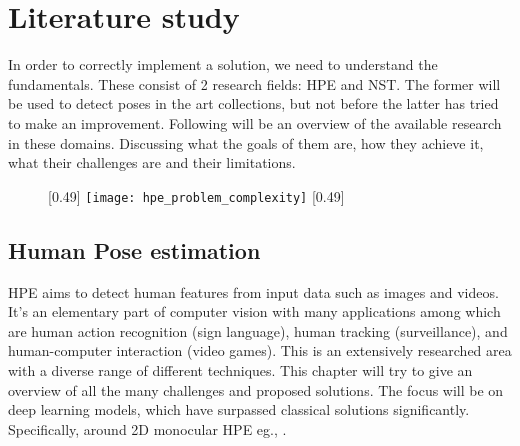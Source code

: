 \graphicspath{{images/chapter1/}}

\chapter{Literature study}
\label{chap:rel_work}
In order to correctly implement a solution, we need to understand the fundamentals.
These consist of 2 research fields: \gls{HPE} and \gls{NST}.
The former will be used to detect poses in the art collections, but not before the latter has tried to make an improvement.
Following will be an overview of the available research in these domains.
Discussing what the goals of them are, how they achieve it, what their challenges are and their limitations.

\begin{figure}
	\centering
	[0.49\textwidth]{
		\texttt{[image: hpe\_problem\_complexity]}
		\label{fig:hpe_problem_complexity}
	}
	[0.49\textwidth]{
		\label{fig:pose_representation}
	}
\end{figure}

\section{Human Pose estimation}
\label{sec:hpe}

\gls{HPE} aims to detect human features from input data such as images and videos.
It's an elementary part of computer vision with many applications among which are human action recognition (sign language), human tracking (surveillance), and human-computer interaction (video games).
This is an extensively researched area with a diverse range of different techniques.
This chapter will try to give an overview of all the many challenges and proposed solutions.
The focus will be on deep learning models, which have surpassed classical solutions significantly.
Specifically, around 2D monocular \gls{HPE} eg., \cite{Munea2020}\cite{Zheng2012}\cite{Liu2104}\cite{chen2022}.

